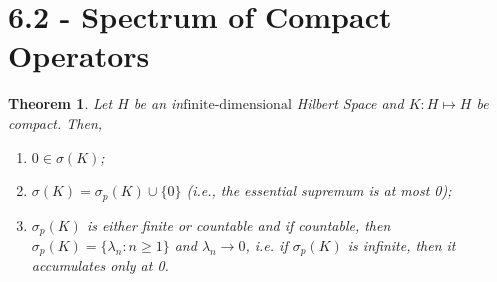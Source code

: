 \documentclass[12pt]{article}
\newtheorem{theorem}{Theorem}
\newcommand{\fd}{{\text{finite-dimensional}}}
\begin{document}
\section*{6.2 - Spectrum of Compact Operators}
\begin{theorem}
Let $H$ be an in$\fd$ Hilbert Space and $K: H \mapsto H$ be compact. Then,
\begin{enumerate}[topsep=-15pt, itemsep=0pt]
\item[(a)] $0 \in \sigma(K)$;
\item[(b)] $\sigma(K) = \sigma_p(K) \cup \{ 0 \}$ (i.e., the essential supremum is at most 0);
\item[(c)] $\sigma_p(K)$ is either finite or countable and if countable, then $\sigma_p(K) = \{ \lambda_n : n \geq 1\}$ and $\lambda_n \to 0$, i.e. if $\sigma_p(K)$ is infinite, then it accumulates only at 0. 
\end{enumerate}
\end{theorem}
\vspace{-25pt}
\end{document}
